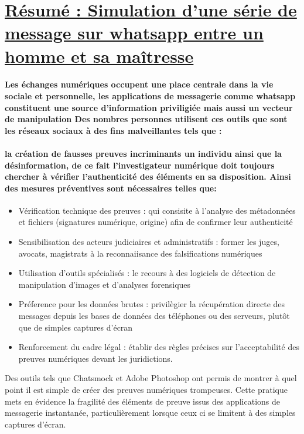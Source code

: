 \documentclass{article}
\begin{document}
\section{\underline{Résumé : Simulation d'une série de message sur whatsapp entre un homme et sa maîtresse}}
\paragraph{Les échanges numériques occupent une place centrale dans la vie sociale et personnelle, les applications de messagerie comme whatsapp constituent une source d'information priviligiée mais aussi un vecteur de manipulation
Des nombres personnes utilisent ces outils que sont les réseaux sociaux à des fins malveillantes tels que :}
\paragraph{ la création de fausses preuves incriminants un individu ainsi que la désinformation, de ce fait l'investigateur numérique doit toujours chercher à vérifier l'authenticité des éléments en sa disposition. Ainsi des mesures préventives sont nécessaires telles que:}
\begin{itemize}

\item Vérification technique des preuves :  qui consisite à l'analyse des métadonnées et fichiers (signatures numérique, origine) afin de confirmer leur authenticité
\item Sensibilisation des acteurs judiciaires et administratifs :  former les juges, avocats, magistrats à la reconnaiisance des falsifications numériques
\item Utilisation d'outils spécialisés : le recours à des logiciels de détection de manipulation d'images et d'analyses forensiques
\item Préference pour les données brutes : privilègier la récupération directe des messages depuis les bases de données des téléphones ou des serveurs, plutôt que de simples captures d'écran
\item Renforcement du cadre légal : établir des règles précises sur l'acceptabilité des preuves numériques devant les juridictions.

\end{itemize}

Des outils tels que Chatsmock et Adobe Photoshop ont permis de montrer à quel point il est simple de créer des preuves numériques trompeuses. Cette pratique mets en évidence la fragilité des éléments de preuve issus des applications de messagerie instantanée, particulièrement lorsque ceux ci se limitent à des simples captures d'écran.
\end{document}
